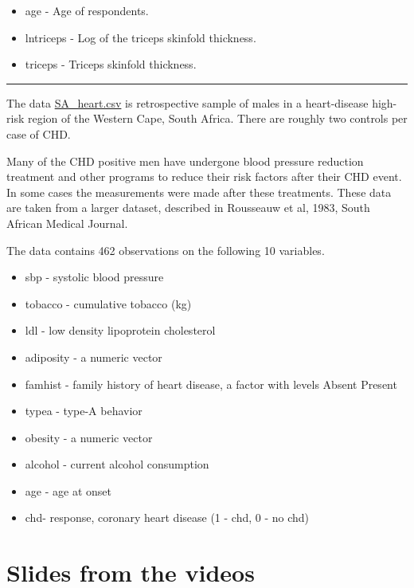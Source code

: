 \documentclass[
]{book}
\providecommand{\tightlist}{%
  \setlength{\itemsep}{0pt}\setlength{\parskip}{0pt}}
\begin{document}
\begin{itemize}
\tightlist
\item
  age - Age of respondents.
\item
  lntriceps - Log of the triceps skinfold thickness.
\item
  triceps - Triceps skinfold thickness.
\end{itemize}

\begin{center}\rule{0.5\linewidth}{0.5pt}\end{center}

The data \href{https://www.dropbox.com/s/cwkw3p91zyizcqz/SA_heart.csv?dl=1}{SA\_heart.csv}
is retrospective sample of males in a heart-disease high-risk region of the
Western Cape, South Africa. There are roughly two controls per case of CHD.

Many of the CHD positive men have undergone blood pressure
reduction treatment and other programs to reduce their risk factors after
their CHD event. In some cases the measurements were made after these
treatments. These data are taken from a larger dataset,
described in Rousseauw et al, 1983, South African Medical Journal.

The data contains 462 observations on the following 10 variables.

\begin{itemize}
\tightlist
\item
  sbp - systolic blood pressure
\item
  tobacco - cumulative tobacco (kg)
\item
  ldl - low density lipoprotein cholesterol
\item
  adiposity - a numeric vector
\item
  famhist - family history of heart disease, a factor
  with levels Absent Present
\item
  typea - type-A behavior
\item
  obesity - a numeric vector
\item
  alcohol - current alcohol consumption
\item
  age - age at onset
\item
  chd- response, coronary heart disease (1 - chd, 0 - no chd)
\end{itemize}

\section*{Slides from the videos}\label{slides-from-the-videos}
\end{document}
